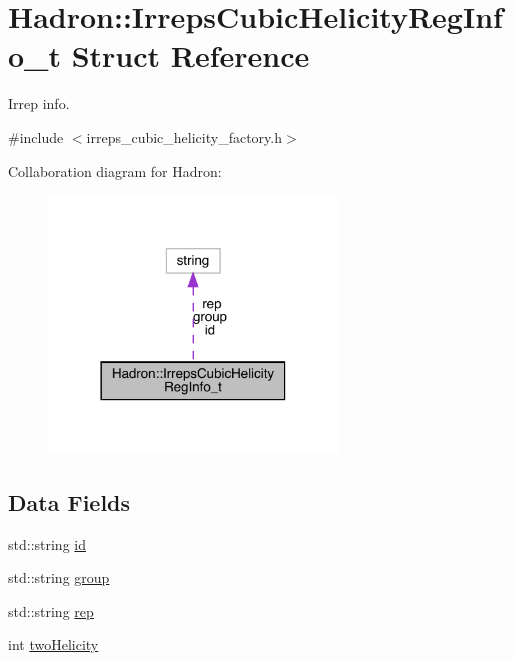 \hypertarget{structHadron_1_1IrrepsCubicHelicityRegInfo__t}{}\section{Hadron\+:\+:Irreps\+Cubic\+Helicity\+Reg\+Info\+\_\+t Struct Reference}
\label{structHadron_1_1IrrepsCubicHelicityRegInfo__t}


Irrep info.  




{\ttfamily \#include $<$irreps\+\_\+cubic\+\_\+helicity\+\_\+factory.\+h$>$}



Collaboration diagram for Hadron\+:\nopagebreak
\begin{figure}[H]
\begin{center}
\leavevmode
\includegraphics[width=218pt]{d9/dfa/structHadron_1_1IrrepsCubicHelicityRegInfo__t__coll__graph}
\end{center}
\end{figure}
\subsection*{Data Fields}
\begin{DoxyCompactItemize}
\item 
std\+::string \mbox{\hyperlink{structHadron_1_1IrrepsCubicHelicityRegInfo__t_ab2dd31dc1245a5a45d7950b45994269b}{id}}
\item 
std\+::string \mbox{\hyperlink{structHadron_1_1IrrepsCubicHelicityRegInfo__t_ab263c6448da0dcbc69846bc4e208cdc5}{group}}
\item 
std\+::string \mbox{\hyperlink{structHadron_1_1IrrepsCubicHelicityRegInfo__t_a2b6edf726bbae1ae97e404a05ab1e230}{rep}}
\item 
int \mbox{\hyperlink{structHadron_1_1IrrepsCubicHelicityRegInfo__t_a56f2014e4c57b36a5da63b9be44f1f0a}{two\+Helicity}}
\end{DoxyCompactItemize}


